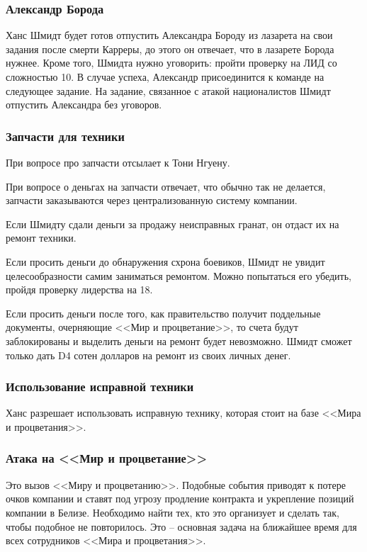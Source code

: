 \documentclass{article}
\begin{document}
\subsubsection{Александр
Борода}\label{alexander-beard}

Ханс Шмидт будет готов отпустить Александра Бороду из лазарета на свои
задания после смерти Карреры, до этого он отвечает, что в лазарете
Борода нужнее. Кроме того, Шмидта нужно уговорить: пройти проверку на
ЛИД со сложностью 10. В случае успеха, Александр присоединится к команде
на следующее задание. На задание, связанное с атакой националистов Шмидт
отпустить Александра без уговоров.

\subsubsection{Запчасти для
техники}\label{vehicle-parts}

При вопросе про запчасти отсылает к Тони Нгуену.

При вопросе о деньгах на запчасти отвечает, что обычно так не делается,
запчасти заказываются через централизованную систему компании.

Если Шмидту сдали деньги за продажу неисправных гранат, он отдаст их на
ремонт техники.

Если просить деньги до обнаружения схрона боевиков, Шмидт не увидит
целесообразности самим заниматься ремонтом. Можно попытаться его
убедить, пройдя проверку лидерства на 18.

Если просить деньги после того, как правительство получит поддельные
документы, очерняющие <<Мир и процветание>>, то счета будут заблокированы
и выделить деньги на ремонт будет невозможно. Шмидт сможет только дать
D4 сотен долларов на ремонт из своих личных денег.

\subsubsection{Использование исправной
техники}\label{using-working-vehicles}

Ханс разрешает использовать исправную технику, которая стоит на базе
<<Мира и процветания>>.

\subsubsection{Атака на <<Мир и
процветание>>}\label{pap-attack-schmidt}

Это вызов <<Миру и процветанию>>. Подобные события приводят к потере очков
компании и ставят под угрозу продление контракта и укрепление позиций
компании в Белизе. Необходимо найти тех, кто это организует и сделать
так, чтобы подобное не повторилось. Это -- основная задача на ближайшее
время для всех сотрудников <<Мира и процветания>>.
\end{document}

